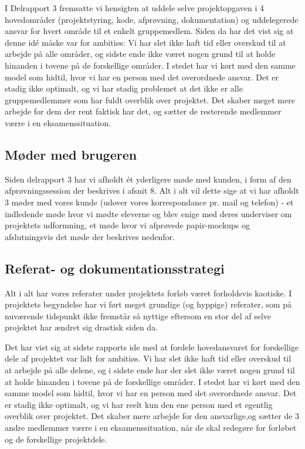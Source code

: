 \documentclass[10pt,a4paper,danish]{article}
\begin{document}
I Delrapport 3 fremsatte vi hensigten at uddele selve projektopgaven i 4 hovedområder
(projektstyring, kode, afprøvning, dokumentation) og uddelegerede ansvar for hvert 
område til et enkelt gruppemedlem. Siden da har det vist sig at denne idé måske var
for ambitiøs: Vi har slet ikke haft tid eller overskud til at arbejde på alle områder, 
og sidste ende ikke været nogen grund til at holde hinanden i tovene på de forskellige
områder. I stedet har vi kørt med den samme model som hidtil, hvor vi har en person med 
det overordnede ansvar. Det er stadig ikke optimalt, og vi har stadig problemet at det 
ikke er alle gruppemedlemmer som har fuldt overblik over projektet.
Det skaber meget mere arbejde for dem der rent faktisk har det,
og sætter de resterende medlemmer værre i en eksamenssituation.

\subsection{Møder med brugeren}
Siden delrapport 3 har vi afholdt ét yderligere møde med kunden, i form af 
den afprøvningssession der beskrives i afsnit 8. Alt i alt vil dette sige 
at vi har afholdt 3 møder med vores kunde (udover vores korrespondance pr. 
mail og telefon) - et indledende møde hvor vi mødte eleverne og blev enige
med deres underviser om projektets udformning, et møde hvor vi afprøvede 
papir-mockups og afslutningsvis det møde der beskrives nedenfor. 

\subsection{Referat- og dokumentationsstrategi}
Alt i alt har vores referater under projektets forløb været forholdsvis 
kaotiske. I projektets begyndelse har vi ført meget grundige (og hyppige)
referater, som på nuværende tidspunkt ikke fremstår så nyttige eftersom 
en stor del af selve projektet har ændret sig drastisk siden da. 

Det har vist sig at sidste rapports ide med at fordele hovedansvaret for
forskellige dele af projektet var lidt for ambitiøs. Vi har slet ikke haft tid
eller overskud til at arbejde på alle delene, og i sidste ende har der slet
ikke været nogen grund til at holde hinanden i tovene på de forskellige områder.
I stedet har vi kørt med den samme model som hidtil, hvor vi har en person med
det overordnede ansvar. Det er stadig ikke optimalt, og vi har reelt kun den ene
person med et egentlig overblik over projektet. Det skaber mere arbejde for den
ansvarlige,og sætter de 3 andre medlemmer værre i en eksamenssituation, når de
skal redegøre for forløbet og de forskellige projektdele.
\end{document}
